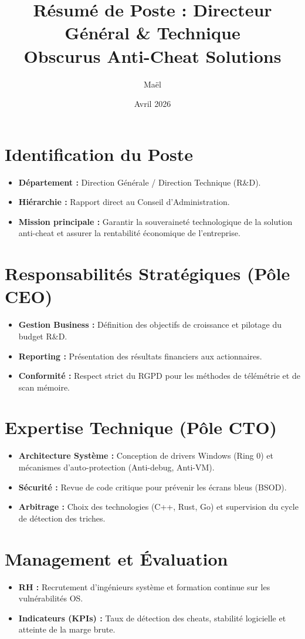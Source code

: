 \documentclass[11pt,a4paper]{article}
\title{Résumé de Poste : Directeur Général \& Technique \\ \large Obscurus Anti-Cheat Solutions}
\author{Maël}
\date{Avril 2026}
\begin{document}
\maketitle

\section{Identification du Poste}
\begin{itemize}[label=\textbullet]
    \item \textbf{Département :} Direction Générale / Direction Technique (R\&D).
    \item \textbf{Hiérarchie :} Rapport direct au Conseil d'Administration.
    \item \textbf{Mission principale :} Garantir la souveraineté technologique de la solution anti-cheat et assurer la rentabilité économique de l'entreprise.
\end{itemize}

\section{Responsabilités Stratégiques (Pôle CEO)}
\begin{itemize}[label=\textbullet]
    \item \textbf{Gestion Business :} Définition des objectifs de croissance et pilotage du budget R\&D.
    \item \textbf{Reporting :} Présentation des résultats financiers aux actionnaires.
    \item \textbf{Conformité :} Respect strict du RGPD pour les méthodes de télémétrie et de scan mémoire.
\end{itemize}

\section{Expertise Technique (Pôle CTO)}
\begin{itemize}[label=\textbullet]
    \item \textbf{Architecture Système :} Conception de drivers Windows (Ring 0) et mécanismes d'auto-protection (Anti-debug, Anti-VM).
    \item \textbf{Sécurité :} Revue de code critique pour prévenir les écrans bleus (BSOD).
    \item \textbf{Arbitrage :} Choix des technologies (C++, Rust, Go) et supervision du cycle de détection des triches.
\end{itemize}

\section{Management et Évaluation}
\begin{itemize}[label=\textbullet]
    \item \textbf{RH :} Recrutement d'ingénieurs système et formation continue sur les vulnérabilités OS.
    \item \textbf{Indicateurs (KPIs) :} Taux de détection des cheats, stabilité logicielle et atteinte de la marge brute.
\end{itemize}
\end{document}

